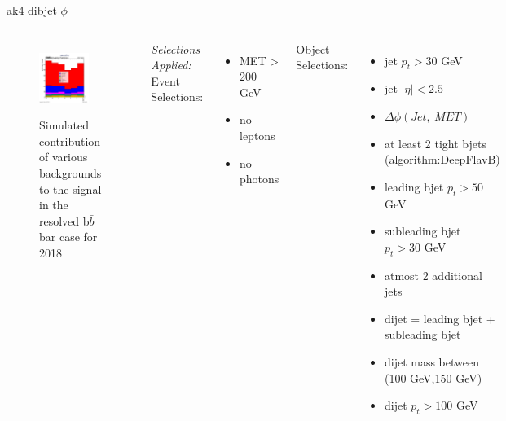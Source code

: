 \documentclass[10pt,xcolor=dvipsnames,aspectratio=169]{beamer}
\begin{document}

\begin{frame}[fragile]{ak4 dibjet $\phi $ }
  \begin{columns}
    \begin{figure}
      \centering
      \includegraphics[width=0.8\textwidth]{../Backgrounds/plots/SR_Resolved_Backgrounds_dijets_phi_Combined.png}
      \label{contribution}
      \caption{Simulated contribution of various backgrounds to the signal in the resolved b$ \bar{b} $ bar case for 2018}
    \end{figure}
    \textit{Selections Applied:} \\
    Event Selections:
    \begin{itemize}
      \raggedright 
      \tiny
      \item {MET > 200 GeV}
      \item {no leptons}
      \item {no photons}
    \end{itemize}
    Object Selections:
    \begin{itemize}
      \raggedright 
      \tiny
      \item {jet $p_t > 30 $ GeV}
      \item {jet $| \eta | < 2.5 $}
      \item {$\Delta \phi (Jet, \ MET)$}
      \item {at least 2 tight bjets (algorithm:DeepFlavB)}
      \item {leading bjet $p_t > 50 $ GeV}
      \item {subleading bjet $p_t > 30 $ GeV}
      \item {atmost 2 additional jets}
      \item {dijet = leading bjet + subleading bjet}
      \item {dijet mass between (100 GeV,150 GeV)}
      \item {dijet $p_t > 100 $ GeV}
    \end{itemize}
  \end{columns}
\end{frame}
\end{document}

